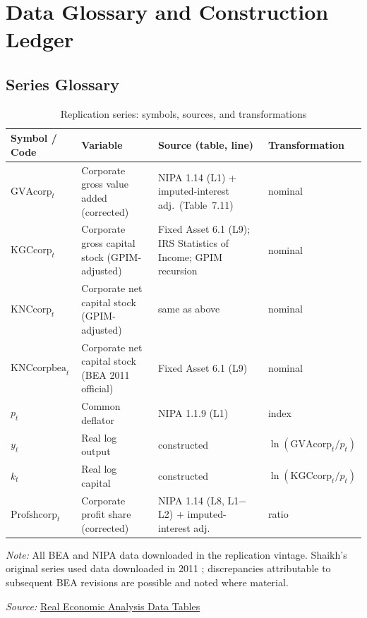 \documentclass[11pt,a4paper]{article}
\begin{document}
\section{Data Glossary and Construction Ledger}
\label{app:data_ledger}


\subsection{Series Glossary}

\begin{table}[!ht]
	\centering
	\small
	\setlength{\tabcolsep}{3pt}
	\renewcommand{\arraystretch}{1.15}
	\caption{Replication series: symbols, sources, and transformations}
	\label{tab:app_glossary}
	\begin{tabular}{@{}>{\raggedright\arraybackslash}p{}
			>{\raggedright\arraybackslash}p{}
			>{\raggedright\arraybackslash}p{}
			>{\raggedright\arraybackslash}p{}@{}}
		\hline
		Symbol / Code & Variable & Source (table, line) & Transformation \\
		\hline
		$\text{GVAcorp}_t$ 
		& Corporate gross value added (corrected)
		& NIPA 1.14 (L1) + imputed-interest adj.\ (Table~7.11)
		& nominal \\[3pt]
		$\text{KGCcorp}_t$ 
		& Corporate gross capital stock (GPIM-adjusted)
		& Fixed Asset 6.1 (L9); IRS Statistics of Income; GPIM recursion
		& nominal \\[3pt]
		$\text{KNCcorp}_t$ 
		& Corporate net capital stock (GPIM-adjusted)
		& same as above
		& nominal \\[3pt]
		$\text{KNCcorpbea}_t$
		& Corporate net capital stock (BEA 2011 official)
		& Fixed Asset 6.1 (L9)
		& nominal \\[3pt]
		$p_t$ 
		& Common deflator
		& NIPA 1.1.9 (L1)
		& index \\[3pt]
		$y_t$
		& Real log output
		& constructed
		& $\ln(\text{GVAcorp}_t/p_t)$ \\[3pt]
		$k_t$
		& Real log capital
		& constructed
		& $\ln(\text{KGCcorp}_t/p_t)$ \\[3pt]
		$\text{Profshcorp}_t$ 
		& Corporate profit share (corrected)
		& NIPA 1.14 (L8, L1$-$L2) + imputed-interest adj.
		& ratio \\
		\hline
	\end{tabular}
	\par\vspace{0.4em}
	\footnotesize\textit{Note:} All BEA and NIPA data downloaded in the
	replication vintage. Shaikh's original series used data downloaded in
	2011 \citep[Appendix~6.7, fn.~1]{Shaikh2016}; discrepancies attributable
	to subsequent BEA revisions are possible and noted where material.
	\par\vspace{0.2em}
	\footnotesize\textit{Source:}
	\href{https://www.realecon.org/data}{Real Economic Analysis Data Tables}
\end{table}
\end{document}
